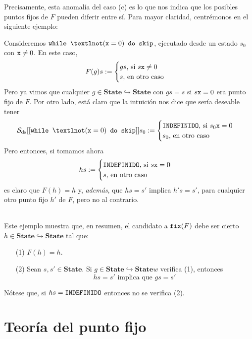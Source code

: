 Precisamente, esta anomalía del caso (c) es lo que nos indica que los posibles puntos fijos de $F$ pueden diferir entre sí. Para mayor claridad, centrémonos en el siguiente ejemplo:

\begin{example}
Consideremos $\n{while } ¬(\n{x}=0)\n{ do skip}$, ejecutado desde un estado $s_0$ con $\texttt{x}\neq 0$. En este caso, 
$$F(g)s := \begin{cases}
    gs \text{, si } s\texttt{x} \neq 0\\
    s \text{, en otro caso}
\end{cases}$$
Pero ya vimos que cualquier $g \in \mathbf{State}\hookrightarrow\mathbf{State}$ con $gs = s$ si $s\texttt{x} = 0$ era punto fijo de $F$. Por otro lado, está claro que la intuición nos dice que sería deseable tener
$$\mc{S}_\nn{ds}[[\n{while } ¬(\n{x}=0)\n{ do skip}]]s_0 := \begin{cases}
    \n{INDEFINIDO} \text{, si } s_0\n{x} = 0 \\
    s_0 \text{, en otro caso}
\end{cases}$$
Pero entonces, si tomamos ahora
$$hs := \begin{cases}
    \texttt{INDEFINIDO} \text{, si } s\texttt{x} = 0 \\
    s \text{, en otro caso}
\end{cases}$$
es claro que $F(h) = h$ y, \textit{además}, que $hs = s'$ implica $h's = s'$, para cualquier otro punto fijo $h'$ de $F$, pero no al contrario. 
\end{example}
\\

Este ejemplo muestra que, en resumen, el candidato a $\texttt{fix}(F)$ debe ser cierto $h \in \mathbf{State}\hookrightarrow\mathbf{State}$ tal que:
\begin{itemize}
    \item[(1)] $F(h)=h$.
    \item[(2)] Sean $s, s' \in \mathbf{State}$. Si $g \in \mathbf{State}\hookrightarrow\mathbf{State}w$ verifica (1), entonces
    $$hs =s' \text{ implica que } gs=s'$$
\end{itemize}
Nótese que, si $hs = \texttt{INDEFINIDO}$ entonces no se verifica (2). 

\section{Teoría del punto fijo}




